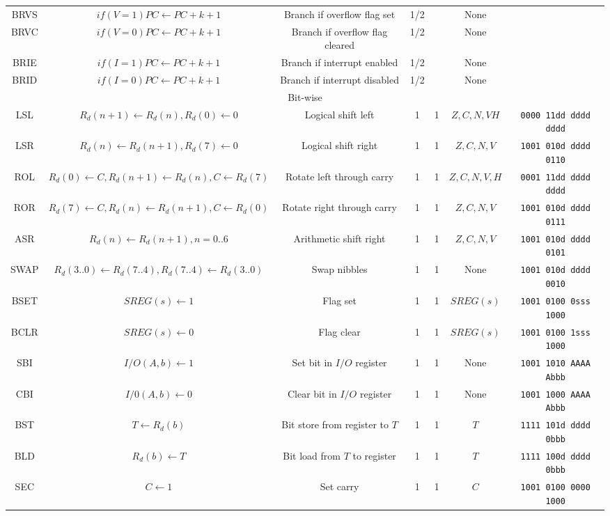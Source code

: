 \documentclass[11pt]{article}
\begin{document}
\begin{center}
\begin{longtable}{|c|c|c|c|c|c|c|}
BRVS & $if(V = 1) PC \leftarrow PC + k + 1$ & Branch if overflow flag set & 1/2 &  & None & \\
BRVC & $if(V = 0) PC \leftarrow PC + k + 1$ & Branch if overflow flag cleared & 1/2 &  & None & \\
BRIE & $if(I = 1) PC \leftarrow PC + k + 1$ & Branch if interrupt enabled & 1/2 &  & None & \\
BRID & $if(I = 0) PC \leftarrow PC + k + 1$ & Branch if interrupt disabled & 1/2 &  & None & \\
\hline\hline
\multicolumn{7}{|c|}{Bit-wise} \\
\hline
LSL & $R_d(n+1) \leftarrow R_d(n), R_d(0) \leftarrow 0$ & Logical shift left & 1 & 1 & $Z, C, N, V H$ & \texttt{0000 11dd dddd dddd}\\
LSR & $R_d(n) \leftarrow R_d(n+1), R_d(7) \leftarrow 0$ & Logical shift right & 1 & 1 & $Z, C, N, V$ & \texttt{1001 010d dddd 0110}\\
ROL & $R_d(0) \leftarrow C, R_d(n+1) \leftarrow R_d(n), C \leftarrow R_d(7)$ & Rotate left through carry & 1 & 1 & $Z, C, N, V, H$ & \texttt{0001 11dd dddd dddd}\\
ROR & $R_d(7) \leftarrow C, R_d(n) \leftarrow R_d(n+1), C \leftarrow R_d(0)$ & Rotate right through carry & 1 & 1 & $Z, C, N, V$ & \texttt{1001 010d dddd 0111}\\
ASR & $R_d(n) \leftarrow R_d(n+1), n=0..6$ & Arithmetic shift right & 1 & 1 & $Z, C, N, V$ & \texttt{1001 010d dddd 0101}\\
SWAP & $R_d(3..0) \leftarrow R_d(7..4), R_d(7..4) \leftarrow R_d(3..0)$ & Swap nibbles & 1 & 1 & None & \texttt{1001 010d dddd 0010}\\
BSET & $SREG(s) \leftarrow 1$ & Flag set & 1 & 1 & $SREG(s)$ & \texttt{1001 0100 0sss 1000}\\
BCLR & $SREG(s) \leftarrow 0$ & Flag clear & 1 & 1 & $SREG(s)$ & \texttt{1001 0100 1sss 1000}\\
SBI & $I/O(A, b) \leftarrow 1$ & Set bit in $I/O$ register & 1 & 1 & None & \texttt{1001 1010 AAAA Abbb}\\
CBI & $I/0(A, b) \leftarrow 0$ & Clear bit in $I/O$ register & 1 & 1 & None & \texttt{1001 1000 AAAA Abbb}\\
BST & $T \leftarrow R_d(b)$ & Bit store from register to $T$ & 1 & 1 & $T$ & \texttt{1111 101d dddd 0bbb}\\
BLD & $R_d(b) \leftarrow T$ & Bit load from $T$ to register & 1 & 1 & $T$ & \texttt{1111 100d dddd 0bbb}\\
SEC & $C \leftarrow 1$ & Set carry & 1 & 1 & $C$ & \texttt{1001 0100 0000 1000}\\

\end{longtable}
\end{center}
\end{document}

